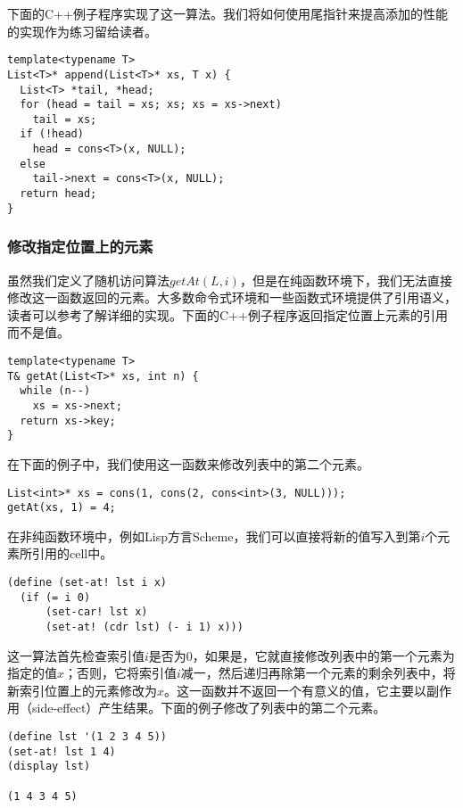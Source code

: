 \documentclass[UTF8]{article}
\begin{document}
下面的C++例子程序实现了这一算法。我们将如何使用尾指针来提高添加的性能的实现作为练习留给读者。

\lstset{language=C++}
\begin{lstlisting}
template<typename T>
List<T>* append(List<T>* xs, T x) {
  List<T> *tail, *head;
  for (head = tail = xs; xs; xs = xs->next)
    tail = xs;
  if (!head)
    head = cons<T>(x, NULL);
  else
    tail->next = cons<T>(x, NULL);
  return head;
}
\end{lstlisting}

\subsubsection{修改指定位置上的元素}

虽然我们定义了随机访问算法$getAt(L, i)$，但是在纯函数环境下，我们无法直接修改这一函数返回的元素。大多数命令式环境和一些函数式环境提供了引用语义，读者可以参考\cite{mittype}了解详细的实现。下面的C++例子程序返回指定位置上元素的引用而不是值。

\lstset{language=C++}
\begin{lstlisting}
template<typename T>
T& getAt(List<T>* xs, int n) {
  while (n--)
    xs = xs->next;
  return xs->key;
}
\end{lstlisting}

在下面的例子中，我们使用这一函数来修改列表中的第二个元素。

\begin{lstlisting}
List<int>* xs = cons(1, cons(2, cons<int>(3, NULL)));
getAt(xs, 1) = 4;
\end{lstlisting}

在非纯函数环境中，例如Lisp方言Scheme，我们可以直接将新的值写入到第$i$个元素所引用的cell中。

\lstset{language=Lisp}
\begin{lstlisting}
(define (set-at! lst i x)
  (if (= i 0)
      (set-car! lst x)
      (set-at! (cdr lst) (- i 1) x)))
\end{lstlisting}

这一算法首先检查索引值$i$是否为0，如果是，它就直接修改列表中的第一个元素为指定的值$x$；否则，它将索引值$i$减一，然后递归再除第一个元素的剩余列表中，将新索引位置上的元素修改为$x$。这一函数并不返回一个有意义的值，它主要以副作用（side-effect）产生结果。下面的例子修改了列表中的第二个元素。

\begin{lstlisting}
(define lst '(1 2 3 4 5))
(set-at! lst 1 4)
(display lst)

(1 4 3 4 5)
\end{lstlisting}
\end{document}
